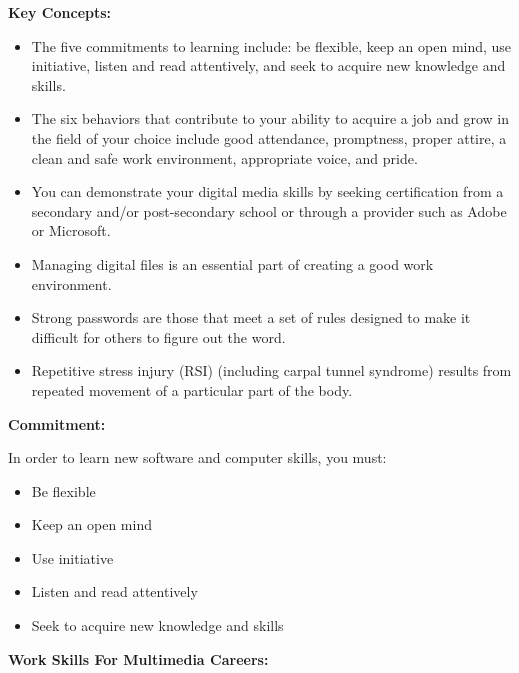 \documentclass{report}
\begin{document}
    \pagebreak
    \begin{Large}
        \noindent \textbf{Key Concepts:}
    \end{Large}

    \bigbreak \noindent 
    \begin{itemize}
        \item The five commitments to learning include: be flexible, keep an open mind, use initiative, listen and read attentively, and seek to acquire new knowledge and skills. 
        \item The six behaviors that contribute to your ability to acquire a job and grow in the field of your choice include good attendance, promptness, proper attire, a clean and safe work environment, appropriate voice, and pride. 
        \item You can demonstrate your digital media skills by seeking certification from a secondary and/or post-secondary school or through a provider such as Adobe or Microsoft.
        \item Managing digital files is an essential part of creating a good work environment. 
        \item Strong passwords are those that meet a set of rules designed to make it difficult for others to figure out the word. 
        \item Repetitive stress injury (RSI) (including carpal tunnel syndrome) results from repeated movement of a particular part of the body.
    \end{itemize}

    \bigbreak \noindent \bigbreak \noindent \bigbreak \noindent  
    \begin{Large}
        \noindent \textbf{Commitment:}
    \end{Large}
    \bigbreak \noindent 
    In order to learn new software and computer skills, you must:

    \bigbreak \noindent 
    \begin{itemize}
        \item Be flexible
        \item Keep an open mind
        \item Use initiative
        \item Listen and read attentively
        \item Seek to acquire new knowledge and skills
    \end{itemize}

    \bigbreak \noindent \bigbreak \noindent \bigbreak \noindent 
    \begin{Large}
        \textbf{Work Skills For Multimedia Careers:}
    \end{Large}
\end{document}
